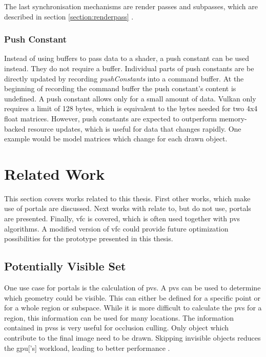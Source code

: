 The last synchronisation mechanisms are render passes and subpasses, which are described in section \ref{section:renderpass} \cite{khronos:vulkan:spec1.1}.



\subsection{Push Constant}

Instead of using buffers to pass data to a shader, a push constant can be used instead. They do not require a buffer. Individual parts of push constants are be directly updated by recording \textit{pushConstants} into a command buffer. At the beginning of recording the command buffer the push constant's content is undefined. A push constant allows only for a small amount of data. Vulkan only requires a limit of 128 bytes, which is equivalent to the bytes needed for two 4x4 float matrices. However, push constants are expected to outperform memory-backed resource updates, which is useful for data that changes rapidly. One example would be model matrices which change for each drawn object. 


\chapter{Related Work}
This section covers works related to this thesis. First other works, which make use of portals are discussed. Next works with relate to, but do not use, portals are presented. Finally, \gls{vfc} is covered, which is often used together with \gls{pvs} algorithms. A modified version of \gls{vfc} could provide future optimization possibilities for the prototype presented in this thesis.


\section{Potentially Visible Set}

One use case for portals is the calculation of \gls{pvs}. A \gls{pvs} can be used to determine which geometry could be visible. This can either be defined for a specific point or for a whole region or subspace. While it is more difficult to calculate the \gls{pvs} for a region, this information can be used for many locations. The information contained in \glspl{pvs} is very useful for occlusion culling. Only object which contribute to the final image need to be drawn. Skipping invisible objects reduces the \gls{gpu}['s] workload, leading to better performance \cite{cohen:2003:survey}.

